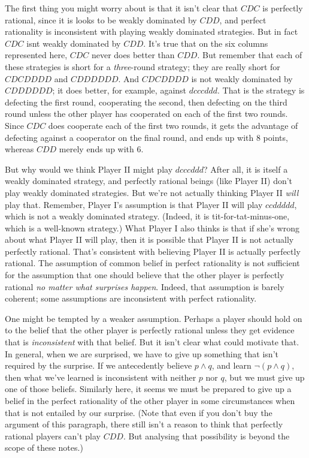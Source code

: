 The first thing you might worry about is that it isn't clear that $CDC$ is perfectly rational, since it is looks to be weakly dominated by $CDD$, and perfect rationality is inconsistent with playing weakly dominated strategies. But in fact $CDC$ isnt weakly dominated by $CDD$. It's true that on the six columns represented here, $CDC$ never does better than $CDD$. But remember that each of these strategies is short for a \textit{three}-round strategy; they are really short for $CDCDDDD$ and $CDDDDDD$. And $CDCDDDD$ is not weakly dominated by $CDDDDDD$; it does better, for example, against $dcccddd$. That is the strategy is defecting the first round, cooperating the second, then defecting on the third round unless the other player has cooperated on each of the first two rounds. Since $CDC$ does cooperate each of the first two rounds, it gets the advantage of defecting against a cooperator on the final round, and ends up with 8 points, whereas $CDD$ merely ends up with 6.

But why would we think Player II might play $dcccddd$? After all, it is itself a weakly dominated strategy, and perfectly rational beings (like Player II) don't play weakly dominated strategies. But we're not actually thinking Player II \textit{will} play that. Remember, Player I's assumption is that Player II will play $ccddddd$, which is not a weakly dominated strategy. (Indeed, it is tit-for-tat-minus-one, which is a well-known strategy.) What Player I also thinks is that if she's wrong about what Player II will play, then it is possible that Player II is not actually perfectly rational. That's consistent with believing Player II is actually perfectly rational. The assumption of common belief in perfect rationality is not sufficient for the assumption that one should believe that the other player is perfectly rational \textit{no matter what surprises happen}. Indeed, that assumption is barely coherent; some assumptions are inconsistent with perfect rationality.

One might be tempted by a weaker assumption. Perhaps a player should hold on to the belief that the other player is perfectly rational unless they get evidence that is \textit{inconsistent} with that belief. But it isn't clear what could motivate that. In general, when we are surprised, we have to give up something that isn't required by the surprise. If we antecedently believe $p \wedge q$, and learn $\neg (p \wedge q)$, then what we've learned is inconsistent with neither $p$ nor $q$, but we must give up one of those beliefs. Similarly here, it seems we must be prepared to give up a belief in the perfect rationality of the other player in some circumstances when that is not entailed by our surprise. (Note that even if you don't buy the argument of this paragraph, there still isn't a reason to think that perfectly rational players can't play $CDD$. But analysing that possibility is beyond the scope of these notes.)

